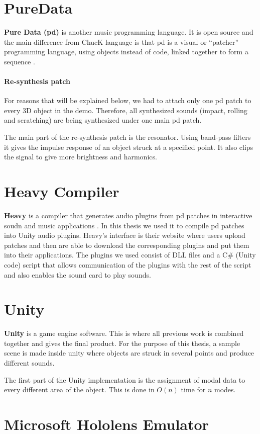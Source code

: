  
\section{PureData}
\textbf{Pure Data (pd)} is another music programming language. It is open source and the main difference from ChucK language is that pd is a visual or ``patcher'' programming language, using objects instead of code, linked together to form a sequence \cite{bib:pd}.

\paragraph{Re-synthesis patch\\}
For reasons that will be explained below, we had to attach only one pd patch to every 3D object in the demo. Therefore, all synthesized sounds (impact, rolling and scratching) are being synthesized under one main pd patch. 

The main part of the re-synthesis patch is the resonator. Using band-pass filters it gives the impulse response of an object struck at a specified point. It also clips the signal to give more brightness and harmonics. 

\section{Heavy Compiler}
\textbf{Heavy} is a compiler that generates audio plugins from pd patches in interactive soudn and music applications \cite{bib:heavy}. In this thesis we used it to compile pd patches into Unity audio plugins. Heavy's interface is their website where users upload patches and then are able to download the corresponding plugins and put them into their applications. The plugins we used consist of DLL files and a C\# (Unity code) script that allows communication of the plugins with the rest of the script and also enables the sound card to play sounds.

\section{Unity\textregistered}
\textbf{Unity\textregistered} is a game engine software. This is where all previous work is combined together and gives the final product. For the purpose of this thesis, a sample scene is made inside unity where objects are struck in several points and produce different sounds. 

The first part of the Unity implementation is the assignment of modal data to every different area of the object. This is done in $O(n)$ time for $n$ modes. 


\section{Microsoft Hololens Emulator}

